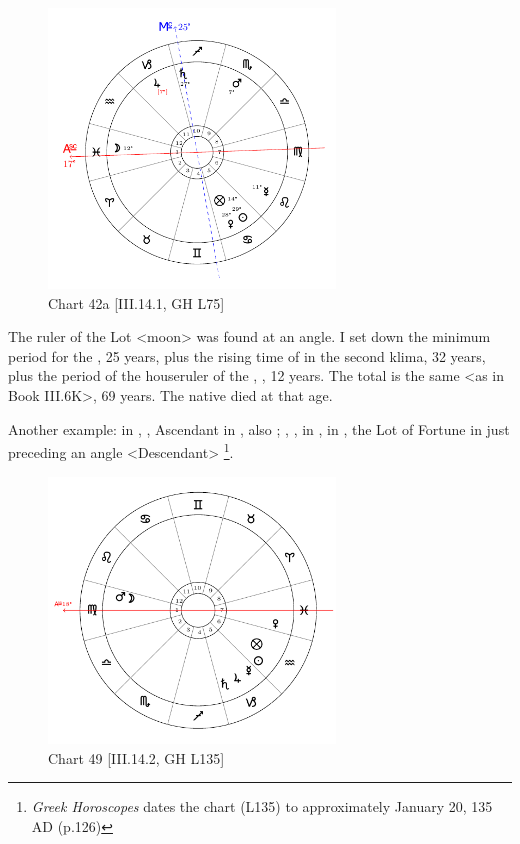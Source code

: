 \clearpage
\begin{figure}
\centering
\vspace{-20pt}
\includegraphics[width=0.68\textwidth]{charts/3_14_1}
\caption{Chart 42a [III.14.1, GH L75]}
\label{fig:chart42a}
\end{figure}  

The ruler of the Lot <moon> was found at an angle. I set down the minimum period for the \Moon, 25 years, plus the rising time of \Cancer\xspace in the second klima, 32 years, plus the period of the houseruler of the \Moon, \Jupiter, 12 years. The total is the same <as in Book III.6K>, 69
years. The native died at that age.

\newpage
Another example: \Sun\xspace in \Aquarius, \Moon, Ascendant in \Virgo, also \Mars; \Saturn, \Jupiter, \Mercury\xspace in \Capricorn, \Venus\xspace in \Pisces, the Lot of Fortune in \Aquarius\xspace just preceding an angle <Descendant>
\footnote{\textit{Greek Horoscopes} dates the chart (L135) to approximately January 20, 135 AD (p.126)}.

\clearpage
\begin{figure}
\centering
\vspace{-20pt}
\includegraphics[width=0.68\textwidth]{charts/3_14_2}
\caption{Chart 49 [III.14.2, GH L135]}
\label{fig:chart49}
\end{figure} 

